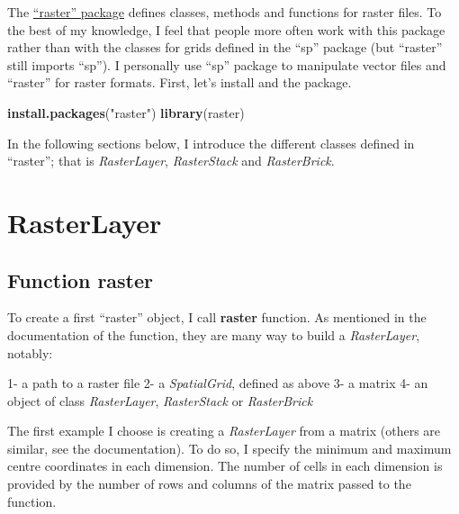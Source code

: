 \documentclass[]{report}
\newenvironment{Shaded}{\begin{snugshade}}{\end{snugshade}}
\newcommand{\KeywordTok}[1]{\textcolor[rgb]{0.13,0.29,0.53}{\textbf{{#1}}}}
\newcommand{\StringTok}[1]{\textcolor[rgb]{0.31,0.60,0.02}{{#1}}}
\newcommand{\NormalTok}[1]{{#1}}
\begin{document}
The
\href{http://cran.r-project.org/web/packages/raster/raster.pdf}{``raster''
package} defines classes, methods and functions for raster files. To the
best of my knowledge, I feel that people more often work with this
package rather than with the classes for grids defined in the ``sp''
package (but ``raster'' still imports ``sp''). I personally use ``sp''
package to manipulate vector files and ``raster'' for raster formats.
First, let's install and the package.

\begin{Shaded}
\begin{Highlighting}[]
\KeywordTok{install.packages}\NormalTok{(}\StringTok{"raster"}\NormalTok{)}
\KeywordTok{library}\NormalTok{(raster)}
\end{Highlighting}
\end{Shaded}

In the following sections below, I introduce the different classes
defined in ``raster''; that is \emph{RasterLayer}, \emph{RasterStack}
and \emph{RasterBrick}.

\section{RasterLayer}\label{rasterlayer}

\subsection{\texorpdfstring{Function
\textbf{raster}}{Function raster}}\label{function-raster}

To create a first ``raster'' object, I call \textbf{raster} function. As
mentioned in the documentation of the function, they are many way to
build a \emph{RasterLayer}, notably:

1- a path to a raster file 2- a \emph{SpatialGrid}, defined as above 3-
a matrix 4- an object of class \emph{RasterLayer}, \emph{RasterStack} or
\emph{RasterBrick}

The first example I choose is creating a \emph{RasterLayer} from a
matrix (others are similar, see the documentation). To do so, I specify
the minimum and maximum centre coordinates in each dimension. The number
of cells in each dimension is provided by the number of rows and columns
of the matrix passed to the function.
\end{document}
